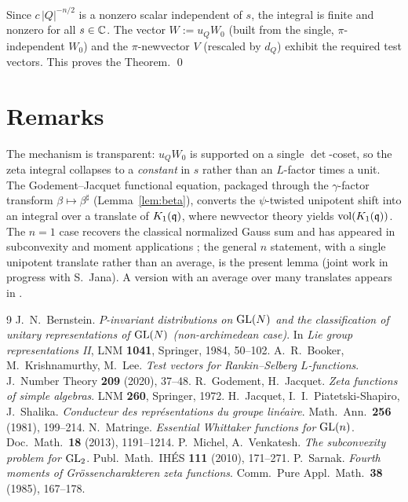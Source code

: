 \documentclass[11pt]{article}
\begin{document}
Since $c\,|Q|^{-n/2}$ is a nonzero scalar independent of $s$, the integral is
finite and nonzero for all $s\in\mathbb{C}$. The vector $W:=u_Q W_0$ (built from the
single, $\pi$-independent $W_0$) and the $\pi$-newvector $V$ (rescaled by $d_Q$)
exhibit the required test vectors. This proves the Theorem. \qed

\section*{Remarks}

The mechanism is transparent: $u_Q W_0$ is supported on a single $\det$-coset, so
the zeta integral collapses to a \emph{constant} in $s$ rather than an
$L$-factor times a unit. The Godement--Jacquet functional equation, packaged
through the $\gamma$-factor transform $\beta\mapsto\beta^\sharp$
(Lemma~\ref{lem:beta}), converts the $\psi$-twisted unipotent shift into an
integral over a translate of $K_1(\mathfrak{q})$, where newvector theory yields
$\operatorname{vol}(K_1(\mathfrak{q}))$. The $n=1$ case recovers the classical normalized Gauss sum and
has appeared in subconvexity and moment applications \cite{Sarnak,MV}; the
general $n$ statement, with a single unipotent translate rather than an average,
is the present lemma (joint work in progress with S.~Jana). A version with an
average over many translates appears in \cite{BKL}.

\begin{thebibliography}{9}
 J.~N.~Bernstein.
  \emph{$P$-invariant distributions on $\mathrm{GL}(N)$ and the classification of
  unitary representations of $\mathrm{GL}(N)$ (non-archimedean case)}. In
  \emph{Lie group representations II}, LNM \textbf{1041}, Springer, 1984,
  50--102.
 A.~R.~Booker, M.~Krishnamurthy, M.~Lee.
  \emph{Test vectors for Rankin--Selberg $L$-functions}.
  J.\ Number Theory \textbf{209} (2020), 37--48.
 R.~Godement, H.~Jacquet.
  \emph{Zeta functions of simple algebras}. LNM \textbf{260}, Springer, 1972.
 H.~Jacquet, I.~I.~Piatetski-Shapiro, J.~Shalika.
  \emph{Conducteur des repr\'esentations du groupe lin\'eaire}.
  Math.\ Ann.\ \textbf{256} (1981), 199--214.
 N.~Matringe.
  \emph{Essential Whittaker functions for $\mathrm{GL}(n)$}.
  Doc.\ Math.\ \textbf{18} (2013), 1191--1214.
 P.~Michel, A.~Venkatesh.
  \emph{The subconvexity problem for $\mathrm{GL}_2$}.
  Publ.\ Math.\ IH\'ES \textbf{111} (2010), 171--271.
 P.~Sarnak.
  \emph{Fourth moments of Gr\"ossencharakteren zeta functions}.
  Comm.\ Pure Appl.\ Math.\ \textbf{38} (1985), 167--178.
\end{thebibliography}
\end{document}

